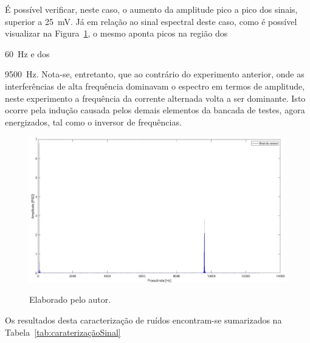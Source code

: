 \documentclass[
	12pt,				
	oneside,			
	a4paper,			
	english,			
	brazil,			
	]{abntex2ppgsi}
\begin{document}
{{{É possível verificar, neste caso, o aumento da amplitude pico a pico dos sinais, superior a {\SI{25}{\milli\volt}}. Já em relação ao sinal espectral deste caso, como é possível visualizar na Figura~\ref{PSD_SENSOR_MAQUINA_LIGADA_E_ENERGIZADA}, o mesmo aponta picos na região dos {\SI{60}{\hertz} e dos {\SI{9500}{\hertz}. Nota-se, entretanto, que ao contrário do experimento anterior, onde as interferências de alta frequência dominavam o espectro em termos de amplitude, neste experimento a frequência da corrente alternada volta a ser dominante. Isto ocorre pela indução causada pelos demais elementos da bancada de testes, agora energizados, tal como o inversor de frequências.   

\begin{figure}[H]
\centering
\caption {Elaborado pelo autor.}
\includegraphics[width=170mm,keepaspectratio]{Caso0/PSD_SENSOR_MAQUINA_LIGADA_E_ENERGIZADA}
\label{PSD_SENSOR_MAQUINA_LIGADA_E_ENERGIZADA}
\end{figure} 

Os resultados desta caracterização de ruídos encontram-se sumarizados na Tabela~\ref{tab:caraterizaçãoSinal}

\begin{table}[ht]
\caption{Caracterização do ruído elétrico capturado pelo sistema}
\centering
{}
\label{tab:caraterizaçãoSinal}
\end{table}


}}}}}
\end{document}
